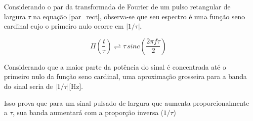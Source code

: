 \begin{comment}
Para demonstrar a relação da largura do pulso de um sinal pulsado com a banda ocupada, será feita a análise de um trem de pulsos de período $T$ e largura $\tau$, tal que:

\begin{equation}
    \Pi_T\left(\frac{t}{\tau}\right) = \sum_{n = -\infty}^{\infty} \Pi\left(\frac{t-nT}{\tau}\right)
\end{equation}

\end{comment}

Considerando o par da transformada de Fourier de um pulso retangular de largura $\tau$ na equação \ref{par_rect}, observa-se que seu espectro é uma função seno cardinal cujo o primeiro nulo ocorre em $|1/\tau|$. 

\begin{equation}\label{par_rect}
    \Pi\left(\frac{t}{\tau}\right) \rightleftharpoons \tau \, sinc \left(\frac{2\pi f \tau}{2}\right)
\end{equation}

Considerando que a maior parte da potência do sinal é concentrada até o primeiro nulo da função seno cardinal, uma aproximação grosseira para a banda do sinal seria de $|1/\tau|$[Hz]. 

Isso prova que para um sinal pulsado de largura que aumenta proporcionalmente a $\tau$, sua banda aumentará com a proporção inversa ($1/\tau$)